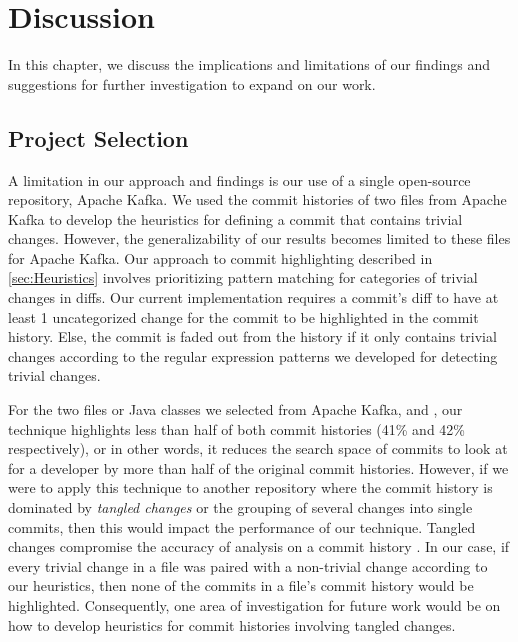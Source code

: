 \chapter{Discussion}
\label{ch:Discussion}


In this chapter, we discuss the implications and limitations of our findings 
and suggestions for further investigation to expand on our work.


\section{Project Selection}

A limitation in our approach and findings is our use of a single open-source repository, Apache Kafka.
We used the commit histories of two files from Apache Kafka to develop the heuristics for defining a commit that contains trivial changes.
However, the generalizability of our results becomes limited to these files for Apache Kafka.
Our approach to commit highlighting described in \autoref{sec:Heuristics}
involves prioritizing pattern matching for categories of trivial changes in diffs.
Our current implementation requires a commit's diff to have at least 1 uncategorized change
for the commit to be highlighted in the commit history.
Else, the commit is faded out from the history if it only contains trivial changes according to the regular expression patterns
we developed for detecting trivial changes.

For the two files or Java classes we selected from Apache Kafka,
 and ,
our technique highlights less than half of both commit histories (41\% and 42\% respectively),
or in other words, it reduces the search space of commits to look at for a developer 
by more than half of the original commit histories.
However, if we were to apply this technique to another repository where the commit history is 
dominated by \emph{tangled changes} or the grouping of several changes into single commits, 
then this would impact the performance of our technique.
Tangled changes compromise the accuracy of analysis on a commit history \cite{herzig_tangled_2013}.
In our case, if every trivial change in a file was paired with a non-trivial change according to our heuristics,
then none of the commits in a file's commit history would be highlighted.
Consequently, one area of investigation for future work would be on how to
develop heuristics for commit histories involving tangled changes.


